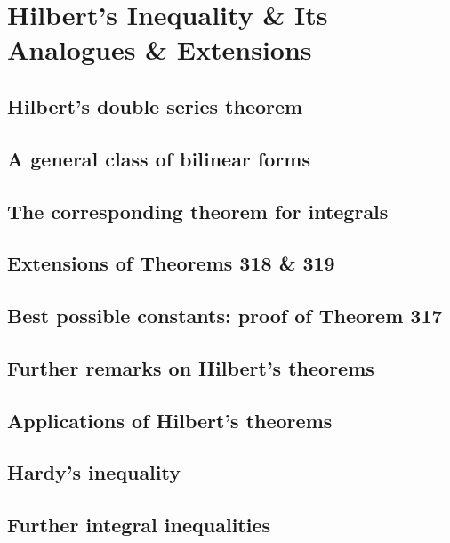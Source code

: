 \documentclass[oneside]{book}
\numberwithin{equation}{section}
\begin{document}

\section{Hilbert's Inequality \& Its Analogues \& Extensions}

\subsection{Hilbert's double series theorem}

\subsection{A general class of bilinear forms}

\subsection{The corresponding theorem for integrals}

\subsection{Extensions of Theorems 318 \& 319}

\subsection{Best possible constants: proof of Theorem 317}

\subsection{Further remarks on Hilbert's theorems}

\subsection{Applications of Hilbert's theorems}

\subsection{Hardy's inequality}

\subsection{Further integral inequalities}
\end{document}
